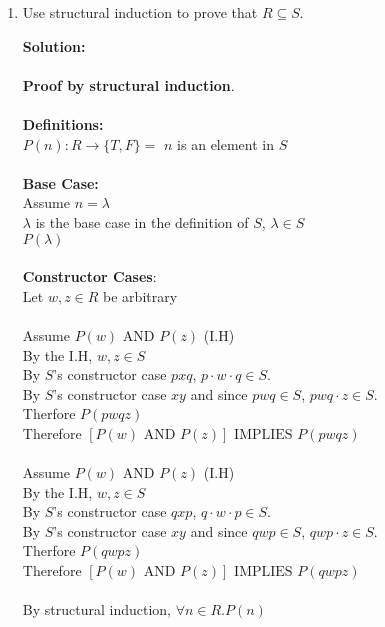 \documentclass[11pt]{article}
\newcommand{\Implies}{\mbox{ IMPLIES }}
\newcommand{\And}{\mbox{ AND }}
\begin{document}
\begin{enumerate}
\item
\begin{question}
Use structural induction to prove that $R \subseteq S$.
\end{question}

\begin{solution}
{\bf Solution:}\\\\
{\bf  Proof by structural induction}.\\\\
{\bf Definitions: }\\
$P(n): R\rightarrow\{T,F\} = $ $n$ is an element in $S$\\\\
{\bf Base Case:}\\
\null\quad Assume $n=\lambda$\\
\null\quad $\lambda$ is the base case in the definition of $S$, $\lambda\in S$\\
\null\quad $P(\lambda)$\\\\
{\bf Constructor Cases}:\\
\null\quad Let $w,z\in R$ be arbitrary\\\\
\null\qquad Assume $P(w)\And P(z)$ (I.H)\\
\null\qquad By the I.H, $w,z\in S$\\
\null\qquad By $S$'s constructor case $pxq$, $p\cdot w\cdot q\in S$.\\
\null\qquad By $S$'s constructor case $xy$ and since $pwq\in S$, $pwq\cdot z\in S$.\\
\null\qquad Therfore $P(pwqz)$\\
\null\quad Therefore $[P(w)\And P(z)]\Implies P(pwqz)$\\\\
\null\qquad Assume $P(w)\And P(z)$ (I.H)\\
\null\qquad By the I.H, $w,z\in S$\\
\null\qquad By $S$'s constructor case $qxp$, $q\cdot w\cdot p\in S$.\\
\null\qquad By $S$'s constructor case $xy$ and since $qwp\in S$, $qwp\cdot z\in S$.\\
\null\qquad Therfore $P(qwpz)$\\
\null\quad Therefore $[P(w)\And P(z)]\Implies P(qwpz)$\\\\
By structural induction, $\forall n\in R. P(n)$\\
\null \quad \\\\
\null \quad \\\\
\null \quad \\


\end{solution}
\end{enumerate}
\end{document}
